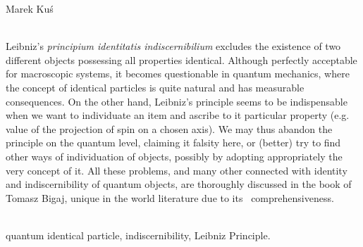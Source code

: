 \begin{newrevengenv}{Marek Kuś}



\vspace{15mm}%
{}\\
{Leibniz's \textit{principium identitatis indiscernibilium} excludes the existence of two different objects possessing all properties identical. Although perfectly acceptable for macroscopic systems, it becomes questionable in quantum mechanics, where the concept of identical particles is quite natural and has measurable consequences. On the other hand, Leibniz’s principle seems to be indispensable when we want to individuate an item and ascribe to it particular property (e.g. value of the projection of spin on a chosen axis). We may thus abandon the principle on the quantum level, claiming it falsity here, or (better) try to find other ways of individuation of objects, possibly by adopting appropriately the very concept of it. All these problems, and many other connected with identity and indiscernibility of quantum objects, are thoroughly discussed in the book of Tomasz Bigaj, unique in the world literature due to its  comprehensiveness.}\par%
\vspace{2mm}%
{}\\
{quantum identical particle, indiscernibility, Leibniz Principle.}%



\end{newrevengenv}
